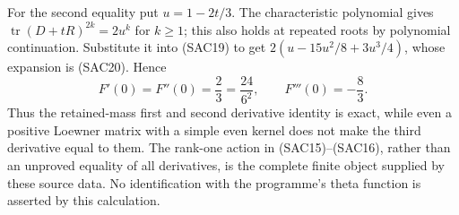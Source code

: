 For the second equality put $u=1-2t/3$. The characteristic
polynomial gives $\operatorname{tr}(D+tR)^{2k}=2u^k$ for
$k\geq1$; this also holds at repeated roots by polynomial
continuation. Substitute it into (SAC19) to get
$2(u-15u^2/8+3u^3/4)$, whose expansion is (SAC20). Hence
\begin{equation}\tag{SAC21}
 F'(0)=F''(0)=\frac23=\frac{24}{6^2},\qquad
 F'''(0)=-\frac83.
\end{equation}
Thus the retained-mass first and second derivative identity
is exact, while even a positive Loewner matrix with a simple
even kernel does not make the third derivative equal to them.
The rank-one action in (SAC15)--(SAC16), rather than an
unproved equality of all derivatives, is the complete finite
object supplied by these source data. No identification with
the programme's theta function is asserted by this calculation.
